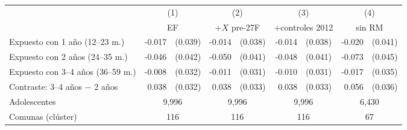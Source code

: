 \begin{tabular}{l rl rl rl rl}
\toprule
 & \multicolumn{2}{c}{(1)} & \multicolumn{2}{c}{(2)} & \multicolumn{2}{c}{(3)} & \multicolumn{2}{c}{(4)} \\
 & \multicolumn{2}{c}{EF} & \multicolumn{2}{c}{$+X$ pre-27F} & \multicolumn{2}{c}{$+$controles 2012} & \multicolumn{2}{c}{sin RM} \\
\midrule
Expuesto con 1 a\~no (12--23 m.) & -0.017 & (0.039) & -0.014 & (0.038) & -0.014 & (0.038) & -0.020 & (0.041) \\
Expuesto con 2 a\~nos (24--35 m.) & -0.046 & (0.042) & -0.050 & (0.041) & -0.048 & (0.041) & -0.073 & (0.045) \\
Expuesto con 3--4 a\~nos (36--59 m.) & -0.008 & (0.032) & -0.011 & (0.031) & -0.010 & (0.031) & -0.017 & (0.035) \\
\addlinespace
Contraste: 3--4 a\~nos $-$ 2 a\~nos & 0.038 & (0.032) & 0.038 & (0.033) & 0.038 & (0.033) & 0.056 & (0.036) \\
\midrule
Adolescentes & \multicolumn{2}{c}{9,996} & \multicolumn{2}{c}{9,996} & \multicolumn{2}{c}{9,996} & \multicolumn{2}{c}{6,430} \\
Comunas (cl\'uster) & \multicolumn{2}{c}{116} & \multicolumn{2}{c}{116} & \multicolumn{2}{c}{116} & \multicolumn{2}{c}{67} \\
\bottomrule
\end{tabular}
